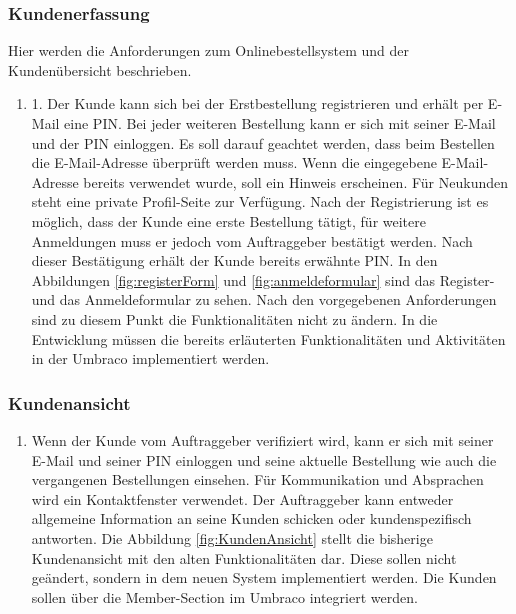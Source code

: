 \subsubsection{Kundenerfassung}

Hier werden die Anforderungen zum Onlinebestellsystem und der Kundenübersicht beschrieben.

\begin{enumerate}
	\item 1.	Der Kunde kann sich bei der Erstbestellung registrieren und erhält per E-Mail eine PIN. Bei jeder weiteren Bestellung kann er sich mit seiner E-Mail und der PIN einloggen. Es soll darauf geachtet werden, dass beim Bestellen die E-Mail-Adresse überprüft werden muss. Wenn die eingegebene E-Mail-Adresse bereits verwendet wurde, soll ein Hinweis erscheinen. Für Neukunden steht eine private Profil-Seite zur Verfügung. Nach der Registrierung ist es möglich, dass der Kunde eine erste Bestellung tätigt, für weitere Anmeldungen muss er jedoch vom Auftraggeber bestätigt werden. Nach dieser Bestätigung erhält der Kunde bereits erwähnte PIN. In den Abbildungen \ref{fig:registerForm} und \ref{fig:anmeldeformular} sind das Register- und das Anmeldeformular zu sehen. Nach den vorgegebenen Anforderungen sind zu diesem Punkt die Funktionalitäten nicht zu ändern. In die Entwicklung müssen die bereits erläuterten Funktionalitäten und Aktivitäten in der Umbraco implementiert werden.
	
\end{enumerate} 

\subsubsection{Kundenansicht}

\begin{enumerate}
	\item Wenn der Kunde vom Auftraggeber verifiziert wird, kann er sich mit seiner E-Mail und seiner PIN einloggen und seine aktuelle Bestellung wie auch die vergangenen Bestellungen einsehen. Für Kommunikation und Absprachen wird ein Kontaktfenster verwendet. Der Auftraggeber kann entweder allgemeine Information an seine Kunden schicken oder kundenspezifisch antworten. Die Abbildung \ref{fig:KundenAnsicht} stellt die bisherige Kundenansicht mit den alten Funktionalitäten dar. Diese sollen nicht geändert, sondern in dem neuen System implementiert werden. Die Kunden sollen über die Member-Section im Umbraco integriert werden.
	
\end{enumerate} 

